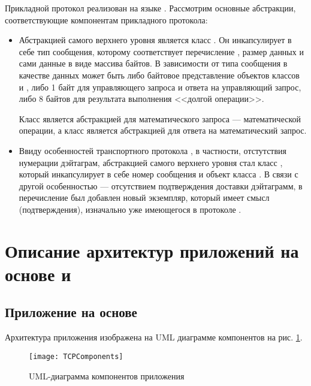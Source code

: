 Прикладной протокол реализован на языке . Рассмотрим основные абстракции, соответствующие компонентам прикладного протокола:

\begin{itemize}
	\item {}
	
	Абстракцией самого верхнего уровня является класс . Он инкапсулирует в себе тип сообщения, которому соответствует перечисление , размер данных и сами данные в виде массива байтов. В зависимости от типа сообщения в качестве данных может быть либо байтовое представление объектов классов  и , либо 1 байт для управляющего запроса и ответа на управляющий запрос, либо 8 байтов для результата выполнения <<долгой операции>>.
	
	Класс  является абстракцией для математического запроса --- математической операции, а класс  является абстракцией для ответа на математический запрос.
	
	\item {}	
	
	Ввиду особенностей транспортного протокола , в частности, отстутствия нумерации 	дэйтаграм, абстракцией самого верхнего уровня стал класс , который инкапсулирует в себе номер сообщения и объект класса . В связи с другой особенностью  --- отсутствием подтверждения доставки дэйтаграмм, в перечисление  был добавлен новый экземпляр, который имеет смысл  (подтверждения), изначально уже имеющегося в протоколе .
	
\end{itemize}

\section{Описание архитектур приложений на основе  и }

\subsection{Приложение на основе }\label{sec:arch:tcp}

Архитектура приложения изображена на UML диаграмме компонентов на рис. \ref{fig:tcp-comp}.

\begin{figure}[H]
	\centering
	\texttt{[image: TCPComponents]}
	\caption{UML-диаграмма компонентов  приложения}
	\label{fig:tcp-comp}
\end{figure}

